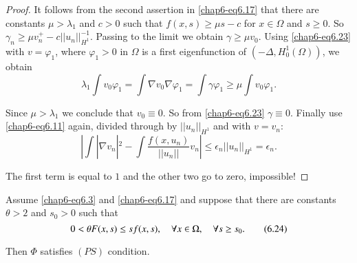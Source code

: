 \begin{proof}
It follows from the second assertion in \eqref{chap6-eq6.17} that
there are constants $\mu>\lambda_{1}$ and $c>0$ such that $f(x,s)\geq
\mu s-c$ for $x\in \Omega$ and $s\geq 0$. So $\gamma_{n}\geq \mu
v^{+}_{n}-c||u_{n}||^{-1}_{H^{1}}$. Passing to the limit we obtain
$\gamma\geq \mu v_{0}$. Using \eqref{chap6-eq6.23} with
$v=\varphi_{1}$, where $\varphi_{1}>0$ in $\Omega$ is a first
eigenfunction of $(-\Delta,H^{1}_{0}(\Omega))$, we obtain
$$
\lambda_{1}\int v_{0}\varphi_{1}=\int \nabla v_{0}\nabla
\varphi_{1}=\int \gamma\varphi_{1}\geq \mu\int v_{0}\varphi_{1}. 
$$

Since $\mu>\lambda_{1}$ we conclude that $v_{0}\equiv 0$. So from
\eqref{chap6-eq6.23} $\gamma\equiv 0$. Finally use
\eqref{chap6-eq6.11} again, divided through by $||u_{n}||_{H^{1}}$ and
with $v=v_{n}$:
$$
|\int|\nabla v_{n}|^{2}-\int \frac{f(x,u_{n})}{||u_{n}||}v_{n}|\leq
\epsilon_{n}||u_{n}||_{H^{1}}=\epsilon_{n}. 
$$

The first term is equal to $1$ and the other two go to zero, impossible!
\end{proof}

\begin{lemma}\label{chap6-lem6.7}
Assume \eqref{chap6-eq6.3} and \eqref{chap6-eq6.17} and suppose that
there are constants $\theta>2$ and $s_{0}>0$ such that
\begin{equation*}
0<\theta F(x,s)\leq sf(x,s),\quad \forall x\in \Omega,\quad \forall s\geq
s_{0}.\tag{6.24}\label{chap6-eq6.24} 
\end{equation*}

Then $\Phi$ satisfies $(PS)$ condition.
\end{lemma}

